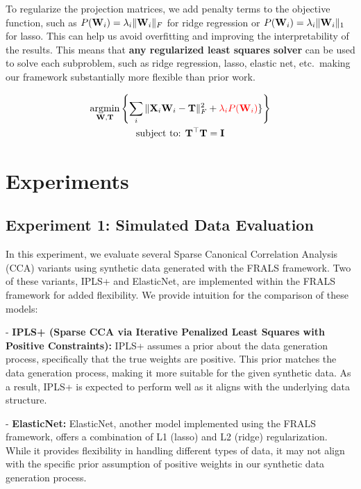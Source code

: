 To regularize the projection matrices, we add penalty terms to the objective function, such as $P(\bold{W}_i)=\lambda_i\|\bold{W}_i\|_F$ for ridge regression or $P(\bold{W}_i)=\lambda_i\|\bold{W}_i\|_1$ for lasso.
This can help us avoid overfitting and improving the interpretability of the results.
This means that \textbf{any regularized least squares solver} can be used to solve each subproblem, such as ridge regression, lasso, elastic net, etc.\ making our framework substantially more flexible than prior work.

\begin{gather*}
    \underset{\bold{W},\bold{T}}{\mathrm{argmin}}\left\{\sum_i \|\bold{X}_i\bold{W}_i-\bold{T}\|_{F}^2 + \textcolor{red}{\lambda_i P(\bold{W}_i)}\}\right\}\\
    \text{subject to: } \bold{T^{\top}T}=\bold{I}\\
\end{gather*}

\section{Experiments}\label{sec:experiments}

\subsection{Experiment 1: Simulated Data Evaluation}\label{subsec:exp1}

In this experiment, we evaluate several Sparse Canonical Correlation Analysis (CCA) variants using synthetic data generated with the FRALS framework.
Two of these variants, IPLS+ and ElasticNet, are implemented within the FRALS framework for added flexibility.
We provide intuition for the comparison of these models:

- \textbf{IPLS+ (Sparse CCA via Iterative Penalized Least Squares with Positive Constraints):} IPLS+ assumes a prior about the data generation process, specifically that the true weights are positive.
This prior matches the data generation process, making it more suitable for the given synthetic data.
As a result, IPLS+ is expected to perform well as it aligns with the underlying data structure.

- \textbf{ElasticNet:} ElasticNet, another model implemented using the FRALS framework, offers a combination of L1 (lasso) and L2 (ridge) regularization.
While it provides flexibility in handling different types of data, it may not align with the specific prior assumption of positive weights in our synthetic data generation process.

